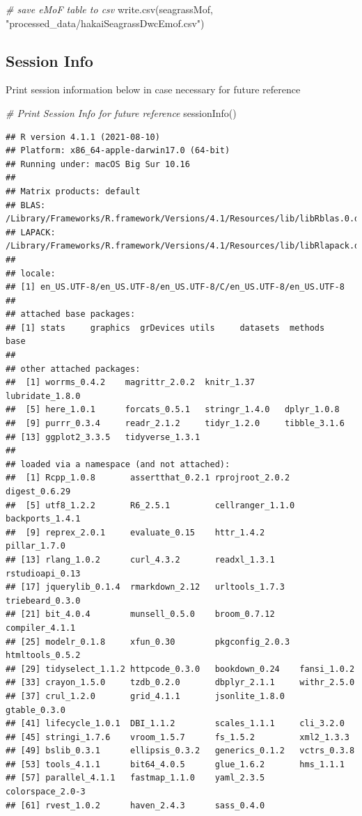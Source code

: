 \documentclass[
]{book}
\newenvironment{Shaded}{\begin{snugshade}}{\end{snugshade}}
\newcommand{\CommentTok}[1]{\textcolor[rgb]{0.56,0.35,0.01}{\textit{#1}}}
\newcommand{\FunctionTok}[1]{\textcolor[rgb]{0.00,0.00,0.00}{#1}}
\newcommand{\NormalTok}[1]{#1}
\newcommand{\StringTok}[1]{\textcolor[rgb]{0.31,0.60,0.02}{#1}}
\begin{document}
\begin{Shaded}
\begin{Highlighting}[]
\CommentTok{\# save eMoF table to csv}
\FunctionTok{write.csv}\NormalTok{(seagrassMof, }\StringTok{"processed\_data/hakaiSeagrassDwcEmof.csv"}\NormalTok{)}
\end{Highlighting}
\end{Shaded}

\hypertarget{session-info}{%
\subsection{Session Info}\label{session-info}}

Print session information below in case necessary for future reference

\begin{Shaded}
\begin{Highlighting}[]
\CommentTok{\# Print Session Info for future reference}
\FunctionTok{sessionInfo}\NormalTok{()}
\end{Highlighting}
\end{Shaded}

\begin{verbatim}
## R version 4.1.1 (2021-08-10)
## Platform: x86_64-apple-darwin17.0 (64-bit)
## Running under: macOS Big Sur 10.16
## 
## Matrix products: default
## BLAS:   /Library/Frameworks/R.framework/Versions/4.1/Resources/lib/libRblas.0.dylib
## LAPACK: /Library/Frameworks/R.framework/Versions/4.1/Resources/lib/libRlapack.dylib
## 
## locale:
## [1] en_US.UTF-8/en_US.UTF-8/en_US.UTF-8/C/en_US.UTF-8/en_US.UTF-8
## 
## attached base packages:
## [1] stats     graphics  grDevices utils     datasets  methods   base     
## 
## other attached packages:
##  [1] worrms_0.4.2    magrittr_2.0.2  knitr_1.37      lubridate_1.8.0
##  [5] here_1.0.1      forcats_0.5.1   stringr_1.4.0   dplyr_1.0.8    
##  [9] purrr_0.3.4     readr_2.1.2     tidyr_1.2.0     tibble_3.1.6   
## [13] ggplot2_3.3.5   tidyverse_1.3.1
## 
## loaded via a namespace (and not attached):
##  [1] Rcpp_1.0.8       assertthat_0.2.1 rprojroot_2.0.2  digest_0.6.29   
##  [5] utf8_1.2.2       R6_2.5.1         cellranger_1.1.0 backports_1.4.1 
##  [9] reprex_2.0.1     evaluate_0.15    httr_1.4.2       pillar_1.7.0    
## [13] rlang_1.0.2      curl_4.3.2       readxl_1.3.1     rstudioapi_0.13 
## [17] jquerylib_0.1.4  rmarkdown_2.12   urltools_1.7.3   triebeard_0.3.0 
## [21] bit_4.0.4        munsell_0.5.0    broom_0.7.12     compiler_4.1.1  
## [25] modelr_0.1.8     xfun_0.30        pkgconfig_2.0.3  htmltools_0.5.2 
## [29] tidyselect_1.1.2 httpcode_0.3.0   bookdown_0.24    fansi_1.0.2     
## [33] crayon_1.5.0     tzdb_0.2.0       dbplyr_2.1.1     withr_2.5.0     
## [37] crul_1.2.0       grid_4.1.1       jsonlite_1.8.0   gtable_0.3.0    
## [41] lifecycle_1.0.1  DBI_1.1.2        scales_1.1.1     cli_3.2.0       
## [45] stringi_1.7.6    vroom_1.5.7      fs_1.5.2         xml2_1.3.3      
## [49] bslib_0.3.1      ellipsis_0.3.2   generics_0.1.2   vctrs_0.3.8     
## [53] tools_4.1.1      bit64_4.0.5      glue_1.6.2       hms_1.1.1       
## [57] parallel_4.1.1   fastmap_1.1.0    yaml_2.3.5       colorspace_2.0-3
## [61] rvest_1.0.2      haven_2.4.3      sass_0.4.0
\end{verbatim}
\end{document}
